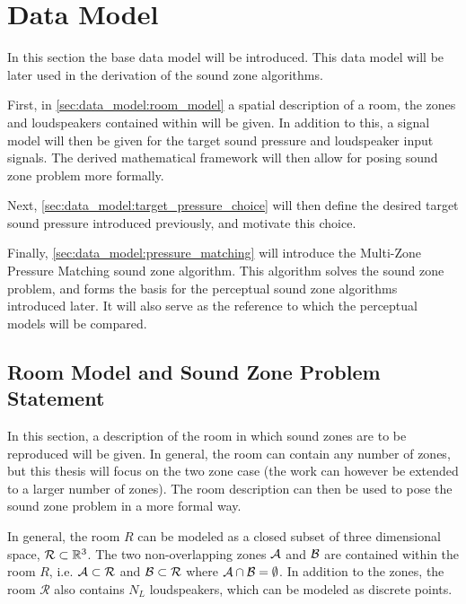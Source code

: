 \section{Data Model}
\label{sec:data_model}
In this section the base data model will be introduced.
This data model will be later used in the derivation of the sound zone algorithms.

First, in \autoref{sec:data_model:room_model} a spatial description of a room, the zones and loudspeakers contained within will be given.
In addition to this, a signal model will then be given for the target sound pressure and loudspeaker input signals.
The derived mathematical framework will then allow for posing sound zone problem more formally. 

Next, \autoref{sec:data_model:target_pressure_choice} will then define the desired target sound pressure introduced previously, and motivate this choice. 

Finally, \autoref{sec:data_model:pressure_matching} will introduce the Multi-Zone Pressure Matching sound zone algorithm. 
This algorithm solves the sound zone problem, and forms the basis for the perceptual sound zone algorithms introduced later.
It will also serve as the reference to which the perceptual models will be compared.

\subsection{Room Model and Sound Zone Problem Statement}
\label{sec:data_model:room_model}
In this section, a description of the room in which sound zones are to be reproduced will be given.
In general, the room can contain any number of zones, but this thesis will focus on the two zone case 
(the work can however be extended to a larger number of zones).
The room description can then be used to pose the sound zone problem in a more formal way.

In general, the room $R$ can be modeled as a closed subset of three dimensional space, $\mathcal{R} \subset \mathbb{R}^{3}$.
The two non-overlapping zones $\mathcal{A}$ and $\mathcal{B}$ are contained within the room $R$, 
i.e. $\mathcal{A} \subset \mathcal{R}$ and $\mathcal{B} \subset \mathcal{R}$ where $\mathcal{A} \cap \mathcal{B} = \emptyset$.
In addition to the zones, the room $\mathcal{R}$ also contains $N_L$ loudspeakers, which can be modeled as discrete points.

